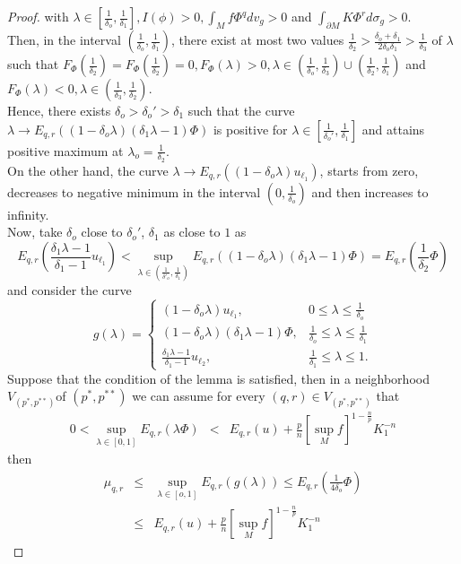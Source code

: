 \documentclass{Tran-l}
\theoremstyle{definition}
\theoremstyle{remark}
\numberwithin{equation}{section}
\begin{document}
\begin{proof}
with
$\lambda\in[\frac{1}{\delta_o},\frac{1}{\delta_1}],I(\phi)>0,\int_Mf\Phi^qdv_g>0$
and $ \int_{\partial M}K\Phi^rd\sigma_g>0$.\\
Then, in the interval $(\frac{1}{\delta_o},\frac{1}{\delta_1})$,
there exist at most two values $\frac{1}{\delta_2}>
\frac{\delta_o+\delta_1}{2\delta_o\delta_1}>\frac{1}{\delta_3}$ of
$\lambda$ such that
$F_\Phi(\frac{1}{\delta_2})=F_\Phi(\frac{1}{\delta_2})=0,
F_\Phi(\lambda)>0,\lambda\in(\frac{1}{\delta_o},\frac{1}{\delta_3})\cup
(\frac{1}{\delta_2},\frac{1}{\delta_1})$ and
$F_\Phi(\lambda)<0,\lambda\in (\frac{1}{\delta_3},
\frac{1}{\delta_2}) $.\\
Hence, there exists $\delta_o>\delta_o'>\delta_1$ such that the
curve $\lambda\rightarrow E_{q,r}((1-\delta_o\lambda)
(\delta_1\lambda-1)\Phi)$ is positive for
$\lambda\in[\frac{1}{\delta_o'},\frac{1}{\delta_1}]$
and attains positive maximum at $\lambda_o=\frac{1}{\delta_2}$.\\
On the other hand, the curve $\lambda\rightarrow
E_{q,r}((1-\delta_o\lambda)u_{\ell_1})$, starts from zero, decreases
to  negative minimum in the interval $(0,\frac{1}{\delta_o})$ and
then increases to infinity.\\
 Now, take $\delta_o$ close to $\delta_o'$, $\delta_1$ as close to $1$
as \begin{equation*} E_{q,r}(\frac{\delta_1\lambda-1}{\delta_1-1}
u_{\ell_1})<\sup_{\lambda\in(\frac{1}{\delta'_o},\frac{1}{\delta_1})}E_{q,r}(
(1-\delta_o\lambda)(\delta_1\lambda-1)\Phi)=E_{q,r}(
\frac{1}{\delta_2}\Phi)
 \end{equation*} and
consider the curve
\begin{equation*}
g(\lambda)=\left\{
\begin{array}{ll}
(1-\delta_o\lambda)u_{\ell_1}, & 0\leq\lambda\leq\frac{1}{\delta_o} \\
(1-\delta_o\lambda)(\delta_1\lambda-1)\Phi,
&\frac{1}{\delta_o}\leq\lambda\leq\frac{1}{\delta_1}\\
\frac{\delta_1\lambda-1}{\delta_1-1} u_{\ell_2},&
\frac{1}{\delta_1}\leq\lambda\leq1.
                   \end{array}
                 \right.
\end{equation*}
Suppose that the condition of the lemma is satisfied, then in a
neighborhood  $V_{(p^{*},p^{**})}$of $(p^{*},p^{**})$ we can assume
for every $(q,r)\in V_{(p^{*},p^{**})}$ that
\begin{eqnarray*}
 0<\underset{\lambda\in[0,1]}\sup E_{q,r}(\lambda\Phi) &<&
E_{q,r}(u)+\frac{p}{n}\left[\sup_Mf\right]^{1-\frac{n}{p}}K_1^{-n}
\end{eqnarray*}
then
\begin{eqnarray*}
 
\mu_{q,r}&\leq&\underset{\lambda\in[o,1]}\sup
E_{q,r}(g(\lambda))\leq E_{q,r}(\frac{1}{4\delta_o}\Phi)\\&\leq&
E_{q,r}(u)+\frac{p}{n}\left[\sup_Mf\right]^{1-\frac{n}{p}}K_1^{-n}
\end{eqnarray*}
\end{proof}
\end{document}
